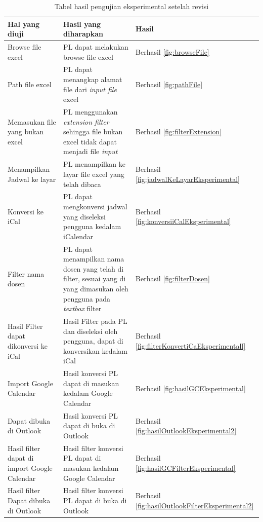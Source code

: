\begin{table}[H]
	\centering
		\caption{Tabel hasil pengujian eksperimental setelah revisi}
		\label{tab:eksperimental}
		\begin{tabular}{ | p{4cm} | p{4cm} | p{4cm} | }
			\hline
				Hal yang diuji & Hasil yang diharapkan & Hasil \\ \hline
				Browse file excel & PL dapat melakukan browse file excel & Berhasil \ref{fig:browseFile}\\ \hline
				Path file excel & PL dapat menangkap alamat file dari \textit{input file} excel & Berhasil \ref{fig:pathFile} \\ \hline
				Memasukan file yang bukan excel & PL menggunakan \textit{extension filter} sehingga file bukan excel tidak dapat menjadi file \textit{input} & Berhasil \ref{fig:filterExtension} \\ \hline
				Menampilkan Jadwal ke layar & PL menampilkan ke layar file excel yang telah dibaca & Berhasil \ref{fig:jadwalKeLayarEksperimental} \\ \hline
				Konversi ke iCal & PL dapat mengkonversi jadwal yang diseleksi pengguna kedalam iCalendar & Berhasil \ref{fig:konversiiCalEksperimental} \\ \hline
				Filter nama dosen & PL dapat menampilkan nama dosen yang telah di filter, sesuai yang di yang dimasukan oleh pengguna pada \textit{textbox} filter & Berhasil \ref{fig:filterDosen} \\ \hline
				Hasil Filter dapat dikonversi ke iCal & Hasil Filter pada PL dan diseleksi oleh pengguna, dapat di konversikan kedalam iCal & Berhasil \ref{fig:filterKonvertiCaEksperimentall} \\ \hline
				Import Google Calendar & Hasil konversi PL dapat di masukan kedalam Google Calendar & Berhasil \ref{fig:hasilGCEksperimental} \\ \hline
				Dapat dibuka di Outlook & Hasil konversi PL dapat di buka di Outlook & Berhasil  \ref{fig:hasilOutlookEksperimental2}\\ \hline
				Hasil filter dapat di import Google Calendar & Hasil filter konversi PL dapat di masukan kedalam Google Calendar & Berhasil \ref{fig:hasilGCFilterEksperimental} \\ \hline
				Hasil filter Dapat dibuka di Outlook & Hasil filter konversi PL dapat di buka di Outlook & Berhasil \ref{fig:hasilOutlookFilterEksperimental2} \\ \hline
		\end{tabular}
\end{table}

